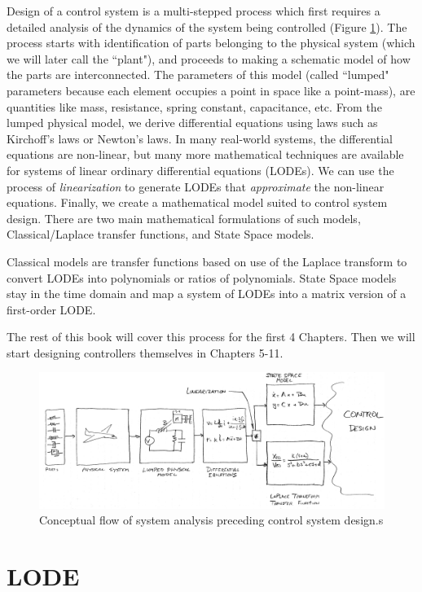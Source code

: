 Design of a control system is a multi-stepped process which first requires a detailed analysis of the dynamics of
the system being controlled (Figure \ref{fig_control_design_flow}).  The process starts with identification of parts belonging
to the physical system (which we will later call the ``plant"), and proceeds to making a schematic model of
how the parts are interconnected.   The parameters of this model (called ``lumped" parameters because each element
occupies a point in space like a point-mass), are quantities like mass, resistance, spring constant, capacitance, etc.
From the lumped physical model, we derive differential equations using laws such as Kirchoff's laws or Newton's laws.
In many real-world systems, the differential equations are non-linear, but many more mathematical techniques are available
for systems of linear ordinary differential equations (LODEs).  We can use the process of {\it linearization} to generate  LODEs
that {\it approximate} the non-linear equations.    Finally, we create a mathematical model suited to control system design.
There are two main mathematical formulations of such models, Classical/Laplace transfer functions, and State Space models.

Classical models are transfer functions based on use of the Laplace transform to convert LODEs into polynomials or ratios
of polynomials.   State Space models stay in the time domain and map a system of LODEs into a matrix version of a first-order
LODE.

The rest of this book will cover this process for the first 4 Chapters.  Then we will start designing controllers themselves
in Chapters 5-11.

\begin{figure}\centering
\includegraphics[width=6.45in]{figs01/01115.png}
\caption{Conceptual flow of system analysis preceding control system design.s}\label{fig_control_design_flow}
\end{figure}


\section{LODE}
